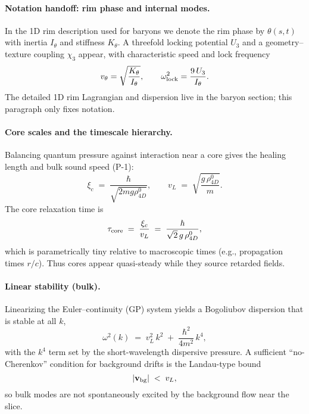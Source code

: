 \paragraph*{Notation handoff: rim phase and internal modes.}
In the 1D rim description used for baryons we denote the rim phase by $\theta(s,t)$ with inertia $I_\theta$ and stiffness $K_\theta$. A threefold locking potential $U_3$ and a geometry–texture coupling $\chi_3$ appear, with characteristic speed and lock frequency
\[
v_\theta=\sqrt{\frac{K_\theta}{I_\theta}},\qquad \omega_{\rm lock}^2=\frac{9\,U_3}{I_\theta}.
\]
The detailed 1D rim Lagrangian and dispersion live in the baryon section; this paragraph only fixes notation.

\paragraph{Core scales and the timescale hierarchy.}
Balancing quantum pressure against interaction near a core gives the healing length and bulk sound speed (P-1):
\begin{equation}
\xi_c \;=\; \frac{\hbar}{\sqrt{2 m g \rho_{4D}^0}},
\qquad
v_L \;=\; \sqrt{\frac{g\,\rho_{4D}^0}{m}}.
\end{equation}
The core relaxation time is
\begin{equation}
\tau_{\rm core} \;=\; \frac{\xi_c}{v_L} \;=\; \frac{\hbar}{\sqrt{2}\,g\,\rho_{4D}^0},
\end{equation}
which is parametrically tiny relative to macroscopic times (e.g., propagation times $r/c$). Thus cores appear quasi-steady while they source retarded fields.

\paragraph{Linear stability (bulk).}
Linearizing the Euler–continuity (GP) system yields a Bogoliubov dispersion that is stable at all $k$,
\begin{equation}
\omega^2(k) \;=\; v_L^2\,k^2 \;+\; \frac{\hbar^2}{4m^2}\,k^4,
\end{equation}
with the $k^4$ term set by the short-wavelength dispersive pressure. A sufficient ``no-Cherenkov'' condition for background drifts is the Landau-type bound
\begin{equation}
|\mathbf v_{\rm bg}| \;<\; v_L,
\end{equation}
so bulk modes are not spontaneously excited by the background flow near the slice.

